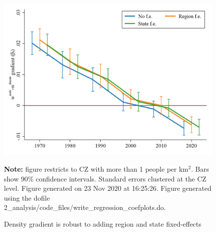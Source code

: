 \begin{figure}[!h]
\centering
\caption{Density gradient is robust to adding region and state fixed-effects}
\label{figure:baseline_gradients}
\includegraphics[width=1\textwidth]{../2_analysis/output/figures/region_fe_full_time.png}
\par \begin{minipage}[h]{\textwidth}{\tiny\textbf{Note:} figure restricts to CZ with more than 1 people per km$^2$. Bars show 90\% confidence intervals. Standard errors clustered at the CZ level. Figure generated on 23 Nov 2020 at 16:25:26. Figure generated using the dofile 2\_analysis/code\_files/write\_regression\_coefplots.do.}\end{minipage}
\end{figure}
